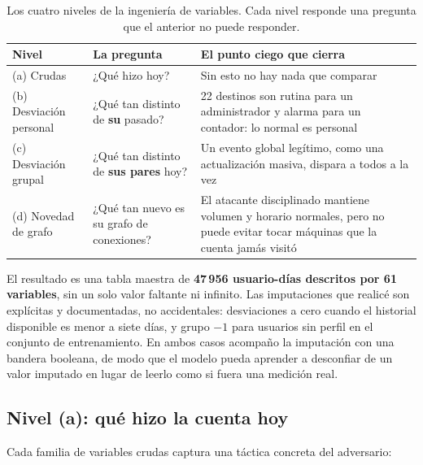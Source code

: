\documentclass[12pt, a4paper]{article}
\begin{document}
\begin{table}[!htb]
\centering
\small
\setlength{\tabcolsep}{5pt}
\begin{tabular}{p{2.6cm}p{4cm}p{6.6cm}}
\toprule
\textbf{Nivel} & \textbf{La pregunta} & \textbf{El punto ciego que cierra} \\
\midrule
(a) Crudas & ¿Qué hizo hoy? & Sin esto no hay nada que comparar \\
(b) Desviación personal & ¿Qué tan distinto de \textbf{su} pasado? & 22 destinos son rutina para un
administrador y alarma para un contador: lo normal es personal \\
(c) Desviación grupal & ¿Qué tan distinto de \textbf{sus pares} hoy? & Un evento global legítimo,
como una actualización masiva, dispara a todos a la vez \\
(d) Novedad de grafo & ¿Qué tan nuevo es su grafo de conexiones? & El atacante disciplinado mantiene
volumen y horario normales, pero no puede evitar tocar máquinas que la cuenta jamás visitó \\
\bottomrule
\end{tabular}
\caption{Los cuatro niveles de la ingeniería de variables. Cada nivel responde una pregunta que el
anterior no puede responder.}
\label{tab:niveles}
\end{table}

El resultado es una tabla maestra de \textbf{47\,956 usuario-días descritos por 61 variables}, sin un
solo valor faltante ni infinito. Las imputaciones que realicé son explícitas y documentadas, no
accidentales: desviaciones a cero cuando el historial disponible es menor a siete días, y grupo $-1$
para usuarios sin perfil en el conjunto de entrenamiento. En ambos casos acompaño la imputación con
una bandera booleana, de modo que el modelo pueda aprender a desconfiar de un valor imputado en lugar
de leerlo como si fuera una medición real.

\subsection{Nivel (a): qué hizo la cuenta hoy}

Cada familia de variables crudas captura una táctica concreta del adversario:
\end{document}
